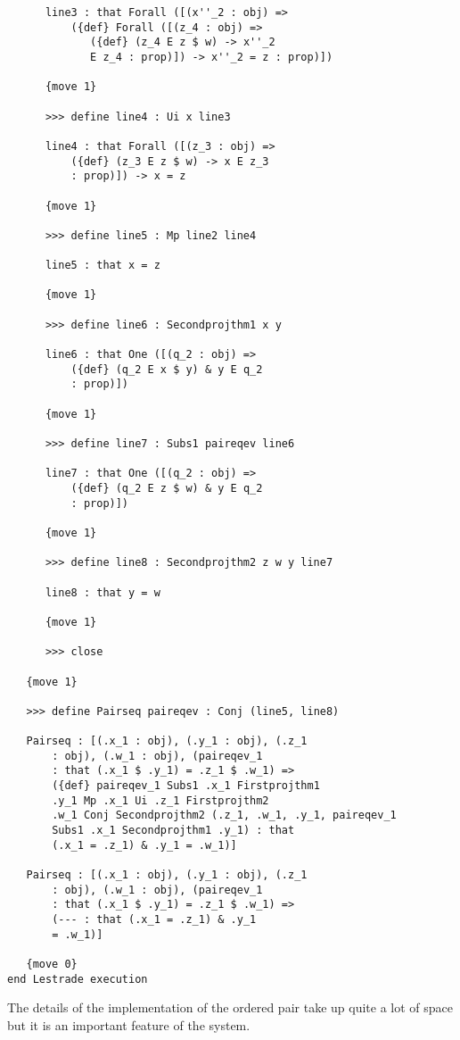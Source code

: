 \documentclass[12pt]{article}
\begin{document}
\begin{verbatim}
      line3 : that Forall ([(x''_2 : obj) => 
          ({def} Forall ([(z_4 : obj) => 
             ({def} (z_4 E z $ w) -> x''_2 
             E z_4 : prop)]) -> x''_2 = z : prop)])

      {move 1}

      >>> define line4 : Ui x line3

      line4 : that Forall ([(z_3 : obj) => 
          ({def} (z_3 E z $ w) -> x E z_3 
          : prop)]) -> x = z

      {move 1}

      >>> define line5 : Mp line2 line4

      line5 : that x = z

      {move 1}

      >>> define line6 : Secondprojthm1 x y

      line6 : that One ([(q_2 : obj) => 
          ({def} (q_2 E x $ y) & y E q_2 
          : prop)])

      {move 1}

      >>> define line7 : Subs1 paireqev line6

      line7 : that One ([(q_2 : obj) => 
          ({def} (q_2 E z $ w) & y E q_2 
          : prop)])

      {move 1}

      >>> define line8 : Secondprojthm2 z w y line7

      line8 : that y = w

      {move 1}

      >>> close

   {move 1}

   >>> define Pairseq paireqev : Conj (line5, line8)

   Pairseq : [(.x_1 : obj), (.y_1 : obj), (.z_1 
       : obj), (.w_1 : obj), (paireqev_1 
       : that (.x_1 $ .y_1) = .z_1 $ .w_1) => 
       ({def} paireqev_1 Subs1 .x_1 Firstprojthm1 
       .y_1 Mp .x_1 Ui .z_1 Firstprojthm2 
       .w_1 Conj Secondprojthm2 (.z_1, .w_1, .y_1, paireqev_1 
       Subs1 .x_1 Secondprojthm1 .y_1) : that 
       (.x_1 = .z_1) & .y_1 = .w_1)]

   Pairseq : [(.x_1 : obj), (.y_1 : obj), (.z_1 
       : obj), (.w_1 : obj), (paireqev_1 
       : that (.x_1 $ .y_1) = .z_1 $ .w_1) => 
       (--- : that (.x_1 = .z_1) & .y_1 
       = .w_1)]

   {move 0}
end Lestrade execution
\end{verbatim}

The details of the implementation of the ordered pair take up quite a lot of space but it is an important feature of the system.
\end{document}
